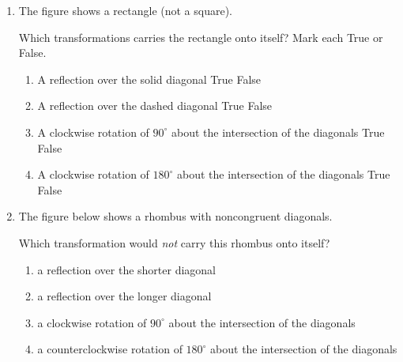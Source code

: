 \documentclass[12pt, oneside]{article}
\begin{document}
\begin{enumerate}[itemsep=0cm]
\item The figure shows a rectangle (not a square).
  \begin{center}
  \end{center}
  Which transformations carries the rectangle onto itself? Mark each True or False.
    \begin{enumerate}
      \item A reflection over the solid diagonal \hfill True \quad False
      \item A reflection over the dashed diagonal \hfill True \quad False
      \item A clockwise rotation of $90^\circ$ about the intersection of the diagonals \hfill True \quad False
      \item A clockwise rotation of $180^\circ$ about the intersection of the diagonals \hfill True \quad False
    \end{enumerate}

\item The figure below shows a rhombus with noncongruent diagonals.
  \begin{center}
  \end{center}
  Which transformation would \emph{not} carry this rhombus onto itself?
    \begin{enumerate}
      \item a reflection over the shorter diagonal
      \item a reflection over the longer diagonal
      \item a clockwise rotation of $90^\circ$ about the intersection of the
      diagonals
      \item a counterclockwise rotation of $180^\circ$ about the intersection of the
      diagonals
    \end{enumerate}
  

\end{enumerate}
\end{document}
